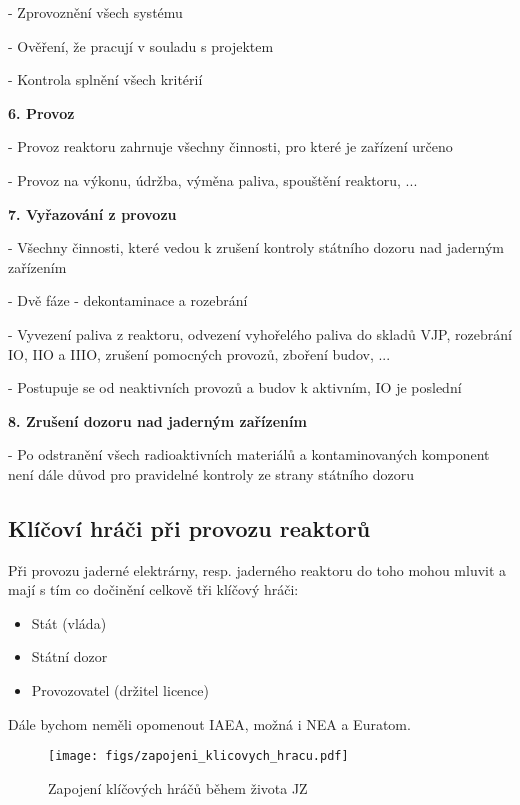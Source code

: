 \noindent - 	Zprovoznění všech systému

\noindent - 	Ověření, že pracují v souladu s projektem

\noindent - 	Kontrola splnění všech kritérií

\noindent\textbf{6. Provoz}

\noindent - 	Provoz reaktoru zahrnuje všechny činnosti, pro které je zařízení určeno

\noindent - 	Provoz na výkonu, údržba, výměna paliva, spouštění reaktoru, ...

\noindent\textbf{7. Vyřazování z provozu}

\noindent - 	Všechny činnosti, které vedou k zrušení kontroly státního dozoru nad jaderným zařízením

\noindent - 	Dvě fáze - dekontaminace a rozebrání

\noindent - 	Vyvezení paliva z reaktoru, odvezení vyhořelého paliva do skladů VJP, rozebrání IO, IIO a IIIO, zrušení pomocných provozů, zboření budov, ...

\noindent - 	Postupuje se od neaktivních provozů a budov k aktivním, IO je poslední

\noindent\textbf{8. Zrušení dozoru nad jaderným zařízením}

\noindent - 	Po odstranění všech radioaktivních materiálů a kontaminovaných komponent není dále důvod pro pravidelné kontroly ze strany státního dozoru

\subsection{Klíčoví hráči při provozu reaktorů}

Při provozu jaderné elektrárny, resp. jaderného reaktoru do toho mohou mluvit a mají s tím co dočinění celkově tři klíčový hráči:

\begin{itemize}
    \item Stát (vláda)
    \item Státní dozor
    \item Provozovatel (držitel licence)
\end{itemize}

Dále bychom neměli opomenout IAEA, možná i NEA a Euratom.

\begin{figure}[ht!]
    \centering
    \texttt{[image: figs/zapojeni\_klicovych\_hracu.pdf]}
    \caption{Zapojení klíčových hráčů během života JZ}
    \label{fig:2_15_zapojeni_klicovych_hracu}
\end{figure}


